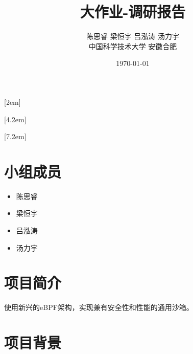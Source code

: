 \documentclass[AutoFakeBold,a4paper]{ctexart}
\begin{document}
\title{\textbf{\Huge 大作业-调研报告}}

\author{陈思睿 \quad 梁恒宇 \quad 吕泓涛 \quad 汤力宇\\
中国科学技术大学 \quad 安徽合肥}

\date{\today}

\maketitle


[2em]{\addvspace{1.3mm}\bf}{%
\contentslabel{2.0em}}{}{\titlerule*[5pt]{$\cdot$}\contentspage}

[4.2em]{}{\contentslabel{2.5em}}{}{%
\titlerule*[5pt]{$\cdot$}\contentspage}

[7.2em]{}{\contentslabel{3.3em}}{}{%
\titlerule*[5pt]{$\cdot$}\contentspage}


    

\tableofcontents

\setcounter{page}{1}

\section{小组成员}

\begin{itemize}
    \item 陈思睿
    \item 梁恒宇
    \item 吕泓涛
    \item 汤力宇
\end{itemize}

\section{项目简介}

使用新兴的eBPF架构，实现兼有安全性和性能的通用沙箱。

\section{项目背景}
\end{document}
